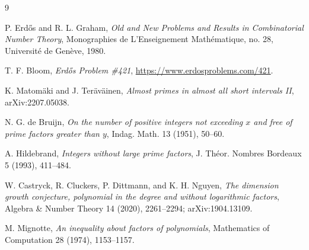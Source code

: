\documentclass[11pt]{article}
\theoremstyle{definition}
\newcommand{\1}{\mathbf 1}
\begin{document}
\begin{thebibliography}{9}

P. Erd\H{o}s and R. L. Graham,
\emph{Old and New Problems and Results in Combinatorial Number Theory},
Monographies de L'Enseignement Math\'ematique, no. 28,
Universit\'e de Gen\`eve, 1980.

T. F. Bloom,
\emph{Erd\H{o}s Problem \#421},
\url{https://www.erdosproblems.com/421}.

K. Matom\"aki and J. Ter\"av\"ainen,
\emph{Almost primes in almost all short intervals II},
arXiv:2207.05038.

N. G. de Bruijn,
\emph{On the number of positive integers not exceeding \(x\) and free of
prime factors greater than \(y\)},
Indag. Math. 13 (1951), 50--60.

A. Hildebrand,
\emph{Integers without large prime factors},
J. Th\'eor. Nombres Bordeaux 5 (1993), 411--484.

W. Castryck, R. Cluckers, P. Dittmann, and K. H. Nguyen,
\emph{The dimension growth conjecture, polynomial in the degree and without
logarithmic factors},
Algebra \& Number Theory 14 (2020), 2261--2294; arXiv:1904.13109.

M. Mignotte,
\emph{An inequality about factors of polynomials},
Mathematics of Computation 28 (1974), 1153--1157.

\end{thebibliography}
\end{document}
